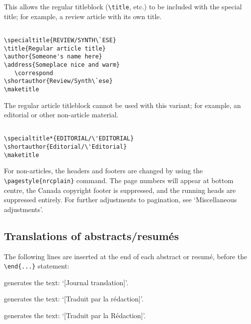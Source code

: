 \begin{description} \itemsep=0pt
   \item [{\tt \blash specialtitle}] \mbox{}

         This allows the regular titleblock (\verb|\title|, etc.) to
         be included with the special title; for example, a review
         article with its own title.
%
\begin{verbatim} 

\specialtitle{REVIEW/SYNTH\`ESE}
\title{Regular article title}
\author{Someone's name here}
\address{Someplace nice and warm}
   \correspond
\shortauthor{Review/Synth\`ese}
\maketitle
\end{verbatim}

   \item [{\tt \blash specialtitle*}]\mbox{}

         The regular article titleblock cannot be used with this
         variant; for example, an editorial or other non-article
         material.
%
\begin{verbatim} 

\specialtitle*{EDITORIAL/\'EDITORIAL}
\shortauthor{Editorial/\'Editorial}
\maketitle
\end{verbatim}

         For non-articles, the headers and footers are changed by
         using the \verb|\pagestyle{nrcplain}| command. The page
         numbers will appear at bottom centre, the \NRC{} Canada
         copyright footer is suppressed, and the running heads are
         suppressed entirely. For further adjustments to pagination, 
         see `Miscellaneous adjustments'.
\end{description}
          

\subsection{Translations of abstracts/resum\'es}

The following lines are inserted at the end of each abstract or
resum\'e, before the \verb|\end{...}| statement:

\begin{description} \itemsep=0pt
   \item [{\tt \blash translation}] generates the text: `[Journal
         translation]'.

   \item [{\tt \blash traduit}] generates the text: `[Traduit par la
         r\'edaction]'.

   \item [{\tt \blash Traduit}] generates the text: `[Traduit par la
         R\'edaction]'.
\end{description}

